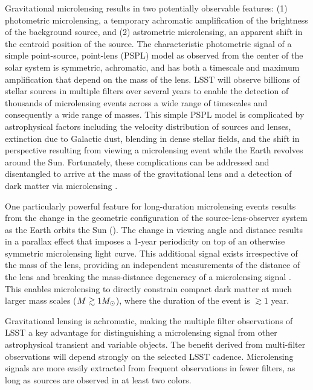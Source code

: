 Gravitational microlensing results in two potentially observable features: (1) photometric microlensing, a temporary achromatic amplification of the brightness of the background source, and (2) astrometric microlensing, an apparent shift in the centroid position of the source.
The characteristic photometric signal of a simple point-source, point-lens (PSPL) model as observed from the center of the solar system is symmetric, achromatic, and has both a timescale and maximum amplification that depend on the mass of the lens.
LSST will observe billions of stellar sources in multiple filters over several years to enable the detection of thousands of microlensing events across a wide range of timescales and consequently a wide range of masses.
This simple PSPL model is complicated by astrophysical factors including the velocity distribution of sources and lenses, extinction due to Galactic dust, blending in dense stellar fields, and the shift in perspective resulting from viewing a microlensing event while the Earth revolves around the Sun.
Fortunately, these complications can be addressed and disentangled to arrive at the mass of the gravitational lens and a detection of dark matter via microlensing \citep{1405.3134,1509.04899}.

One particularly powerful feature for long-duration microlensing events results from the change in the geometric configuration of the source-lens-observer system as the Earth orbits the Sun ().
The change in viewing angle and distance results in a parallax effect that imposes a 1-year periodicity on top of an otherwise symmetric microlensing light curve.
This additional signal exists irrespective of the mass of the lens, providing an independent measurements of the distance of the lens and breaking the mass-distance degeneracy of a microlensing signal \citep[\eg][]{1509.04899}.
This enables microlensing to directly constrain compact dark matter at much larger mass scales ($M \gtrsim 1M_\odot$), where the duration of the event is $\gtrsim 1$ year.   


Gravitational lensing is achromatic, making the multiple filter observations of LSST a key advantage for distinguishing a microlensing signal from other astrophysical transient and variable objects.
The benefit derived from multi-filter observations will depend strongly on the selected LSST cadence. 
Microlensing signals are more easily extracted from frequent observations in fewer filters, as long as sources are observed in at least two colors. 


